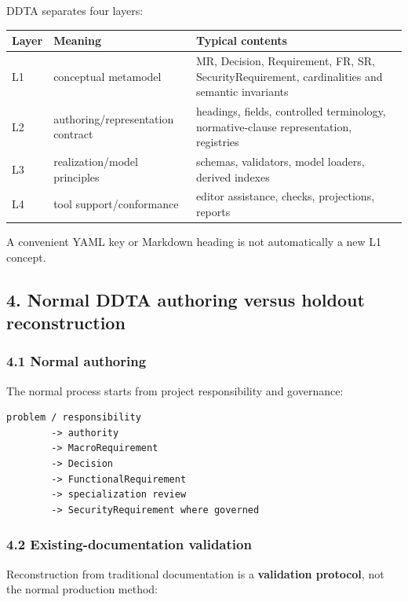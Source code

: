 \documentclass[11pt,a4paper]{article}
\begin{document}
DDTA separates four layers:

\begin{longtable}[]{@{}lll@{}}
\toprule\noalign{}
Layer & Meaning & Typical contents \\
\midrule\noalign{}
\endhead
\bottomrule\noalign{}
\endlastfoot
L1 & conceptual metamodel & MR, Decision, Requirement, FR, SR,
SecurityRequirement, cardinalities and semantic invariants \\
L2 & authoring/representation contract & headings, fields, controlled
terminology, normative-clause representation, registries \\
L3 & realization/model principles & schemas, validators, model loaders,
derived indexes \\
L4 & tool support/conformance & editor assistance, checks, projections,
reports \\
\end{longtable}

A convenient YAML key or Markdown heading is not automatically a new L1
concept.

\subsection{4. Normal DDTA authoring versus holdout
reconstruction}\label{4-normal-ddta-authoring-versus-holdout-reconstruction}

\subsubsection{4.1 Normal authoring}\label{41-normal-authoring}

The normal process starts from project responsibility and governance:

\begin{verbatim}
problem / responsibility
        -> authority
        -> MacroRequirement
        -> Decision
        -> FunctionalRequirement
        -> specialization review
        -> SecurityRequirement where governed
\end{verbatim}

\subsubsection{4.2 Existing-documentation
validation}\label{42-existing-documentation-validation}

Reconstruction from traditional documentation is a \textbf{validation
protocol}, not the normal production method:
\end{document}
